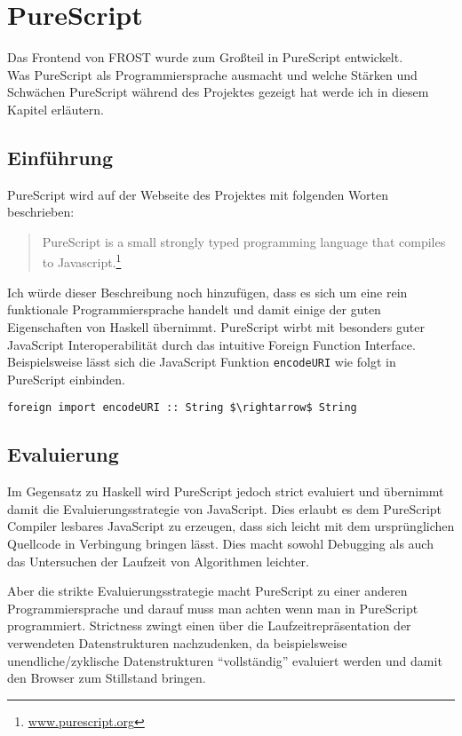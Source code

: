 \chapter{PureScript}
Das Frontend von FROST wurde zum Großteil in PureScript entwickelt.\\
Was PureScript als Programmiersprache ausmacht und welche Stärken und Schwächen
PureScript während des Projektes gezeigt hat werde ich in diesem Kapitel
erläutern.
\section{Einführung}
PureScript wird auf der Webseite des Projektes mit folgenden Worten beschrieben:
\begin{quote}
  PureScript is a small strongly typed programming language that compiles to
  Javascript.\footnote{\url{www.purescript.org}}
\end{quote}
Ich würde dieser Beschreibung noch hinzufügen, dass es sich um eine rein
funktionale Programmiersprache handelt und damit einige der guten Eigenschaften
von Haskell übernimmt.
PureScript wirbt mit besonders guter JavaScript Interoperabilität durch das
intuitive Foreign Function Interface.
Beispielsweise lässt sich die JavaScript Funktion \texttt{encodeURI} wie folgt in
PureScript einbinden.

\begin{lstlisting}
foreign import encodeURI :: String $\rightarrow$ String
\end{lstlisting}


\section{Evaluierung}
Im Gegensatz zu Haskell wird PureScript jedoch strict
evaluiert und übernimmt damit die Evaluierungsstrategie von JavaScript. Dies
erlaubt es dem PureScript Compiler lesbares JavaScript zu erzeugen, dass sich
leicht mit dem ursprünglichen Quellcode in Verbingung bringen lässt. Dies macht
sowohl Debugging als auch das Untersuchen der Laufzeit von Algorithmen leichter.

Aber die strikte Evaluierungsstrategie macht PureScript zu einer anderen
Programmiersprache und darauf muss man achten wenn man in PureScript
programmiert. Strictness zwingt einen über die Laufzeitrepräsentation der
verwendeten Datenstrukturen nachzudenken, da beispielsweise unendliche/zyklische
Datenstrukturen ``vollständig'' evaluiert werden und damit den Browser zum
Stillstand bringen.

